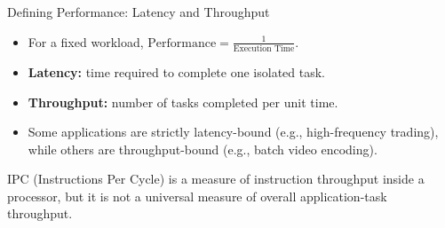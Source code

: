 \documentclass[aspectratio=169,11pt,t]{beamer}
\newcommand{\key}[1]{\textbf{#1}}
\begin{document}
\begin{frame}{Defining Performance: Latency and Throughput}

\begin{itemize}\setlength{\itemsep}{5pt}
  \item For a fixed workload, $\text{Performance} = \frac{1}{\text{Execution Time}}$.
  \item \key{Latency:} time required to complete one isolated task.
  \item \key{Throughput:} number of tasks completed per unit time.
  \item Some applications are strictly latency-bound (e.g., high-frequency trading), while others are throughput-bound (e.g., batch video encoding).
\end{itemize}

\vfill

\centering
{}

\vfill

\small

IPC (Instructions Per Cycle) is a measure of instruction throughput inside a processor, but it is not a universal measure of overall application-task throughput.

\end{frame}





\end{document}
